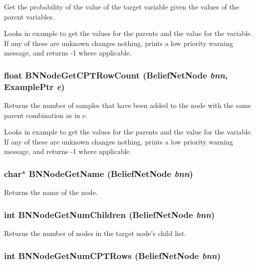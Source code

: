 Get the probability of the value of the target variable given the values of the parent variables. 

Looks in example to get the values for the parents and the value for the variable. If any of these are unknown changes nothing, prints a low priority warning message, and returns -1 where applicable. 
\subsubsection{\setlength{\rightskip}{0pt plus 5cm}float BNNode\-Get\-CPTRow\-Count ({\bf Belief\-Net\-Node} {\em bnn}, {\bf Example\-Ptr} {\em e})}\label{BeliefNet_8h_a34}


Returns the number of samples that have been added to the node with the same parent combination as in e. 

Looks in example to get the values for the parents and the value for the variable. If any of these are unknown changes nothing, prints a low priority warning message, and returns -1 where applicable. 
\subsubsection{\setlength{\rightskip}{0pt plus 5cm}char$\ast$ BNNode\-Get\-Name ({\bf Belief\-Net\-Node} {\em bnn})}\label{BeliefNet_8h_a23}


Returns the name of the node. 

\subsubsection{\setlength{\rightskip}{0pt plus 5cm}int BNNode\-Get\-Num\-Children ({\bf Belief\-Net\-Node} {\em bnn})}\label{BeliefNet_8h_a16}


Returns the number of nodes in the target node's child list. 

\subsubsection{\setlength{\rightskip}{0pt plus 5cm}int BNNode\-Get\-Num\-CPTRows ({\bf Belief\-Net\-Node} {\em bnn})}\label{BeliefNet_8h_a44}


